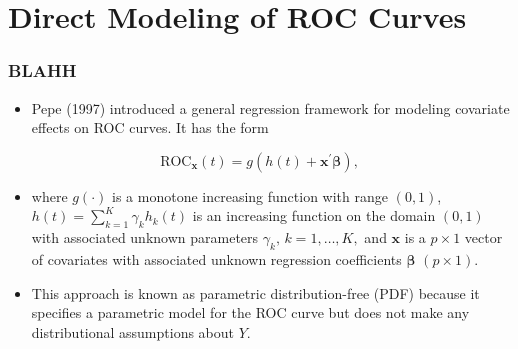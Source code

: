 \documentclass[t]{beamer}
\newcommand{\matr}[1]{\mathbf{#1}}
\begin{document}

\section{Direct Modeling of ROC Curves}

\begin{frame}
\frametitle{BLAHH}
\begin{itemize}
\item Pepe (1997) introduced a general regression framework for modeling covariate effects on ROC curves. It has the form
\end{itemize}
$$\text{ROC}_{\matr{x}}(t) = g\left(h(t) + \matr{x}^{\prime}\bm{\beta}\right),$$
\vspace{-.2in}
\begin{itemize}
\item[] where $g(\cdot)$ is a monotone increasing function with range $(0, 1)$, $h(t) = \sum_{k=1}^K \gamma_kh_k(t)$ is an increasing function on the domain $(0 ,1)$ with associated unknown parameters $\gamma_k, \, k = 1, \dots, K,$ and $\matr{x}$ is a $p \times 1$ vector of covariates with associated unknown regression coefficients $\bm{\beta}$ $(p \times 1)$.
\item This approach is known as parametric distribution-free (PDF) because it specifies a parametric model for the ROC curve but does not make any distributional assumptions about $Y$.
\end{itemize}
\end{frame}
\end{document}
